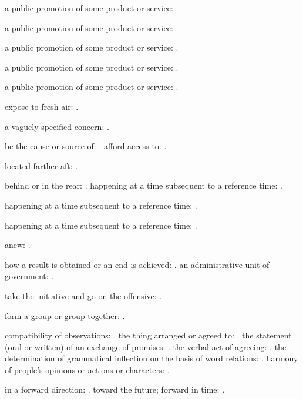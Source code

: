   a public promotion of some product or service: .

  a public promotion of some product or service: .

  a public promotion of some product or service: .

  a public promotion of some product or service: .

  a public promotion of some product or service: .

  expose to fresh air: .

  a vaguely specified concern: .

  be the cause or source of: . afford access to: .

  located farther aft: .

  behind or in the rear: . happening at a time subsequent to a reference time: .

  happening at a time subsequent to a reference time: .

  happening at a time subsequent to a reference time: .

  anew: .

  how a result is obtained or an end is achieved: . an administrative unit of government: .

  take the initiative and go on the offensive: .

  form a group or group together: .

  compatibility of observations: . the thing arranged or agreed to: . the statement (oral or written) of an exchange of promises: . the verbal act of agreeing: . the determination of grammatical inflection on the basis of word relations: . harmony of people's opinions or actions or characters: .

  in a forward direction: . toward the future; forward in time: .

